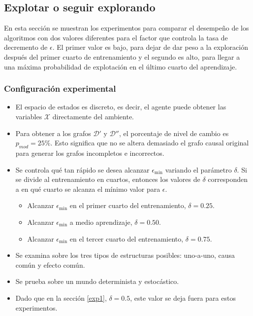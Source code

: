 

\newpage

\subsection{Explotar o seguir explorando}\label{subsection:exp-epsilon}

En esta sección se muestran los experimentos para comparar
el desempeño de los algoritmos con dos valores diferentes para
el factor que controla la tasa de decremento de $\epsilon$. El primer valor 
es bajo, para dejar de dar peso a la exploración después del primer
cuarto de entrenamiento y el segundo es alto, para llegar a una máxima probabilidad
de explotación en el último cuarto del aprendizaje.

\subsubsection{Configuración experimental}

\begin{itemize}
    \item El espacio de estados es discreto, es decir, el agente puede
    obtener las variables $\mathcal{X}$ directamente del ambiente.
    \item Para obtener a los
    grafos $\mathcal{D'}$ y $\mathcal{D''}$,
    el porcentaje de nivel de cambio  es $p_{mod} = 25 \%$. Esto significa que no se altera demasiado el grafo causal original para
    generar los grafos incompletos e incorrectos.
    \item Se controla qué tan rápido se desea alcanzar $\epsilon_{\min}$ variando el parámetro $\delta$. Si se divide al entrenamiento en cuartos,  entonces los valores de $\delta$ corresponden a en qué cuarto se alcanza el mínimo valor para $\epsilon$.
    \begin{itemize}
        \item Alcanzar $\epsilon_{\min}$ en el primer cuarto del entrenamiento, $\delta = 0.25$.
        \item Alcanzar $\epsilon_{\min}$ a medio aprendizaje, $\delta = 0.50$.
        \item Alcanzar $\epsilon_{\min}$ en el tercer cuarto del entrenamiento, $\delta = 0.75$.
    \end{itemize}
    \item Se examina sobre los tres tipos de estructuras posibles: uno-a-uno, 
    causa común y efecto común. 
    \item Se prueba sobre un mundo determinista y estocástico.
    \item Dado que en la sección \ref{exp1}, $\delta=0.5$, este valor se deja fuera para estos experimentos.
\end{itemize}

